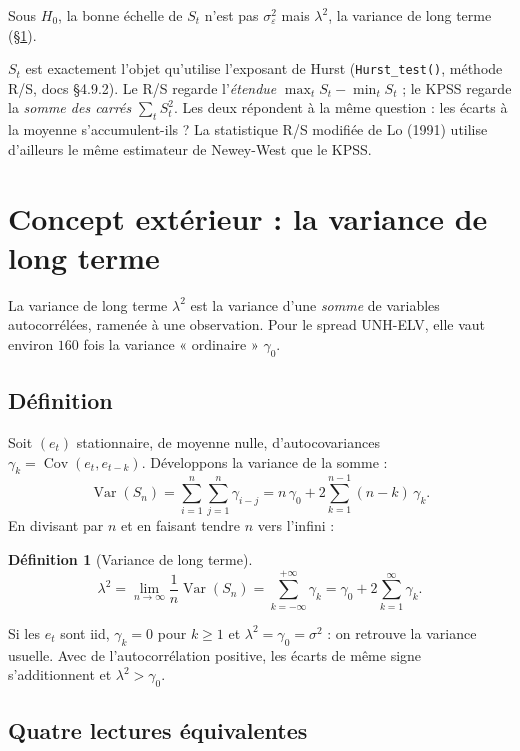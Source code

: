 \documentclass[11pt,a4paper]{article}
\newcommand{\Var}{\operatorname{Var}}
\newcommand{\Cov}{\operatorname{Cov}}
\newcommand{\code}[1]{\texttt{#1}}
\theoremstyle{definition}
\newtheorem{defi}{Définition}
\begin{document}
Sous $H_0$, la bonne échelle de $S_t$ n'est pas $\sigma_\varepsilon^2$ mais $\lambda^2$, la variance de long terme (\S\ref{sec:lrv}).

\begin{projet}
$S_t$ est exactement l'objet qu'utilise l'exposant de Hurst (\code{Hurst\_test()}, méthode R/S, docs \S4.9.2). Le R/S regarde l'\emph{étendue} $\max_t S_t - \min_t S_t$ ; le KPSS regarde la \emph{somme des carrés} $\sum_t S_t^2$. Les deux répondent à la même question : les écarts à la moyenne s'accumulent-ils ? La statistique R/S modifiée de Lo (1991) utilise d'ailleurs le même estimateur de Newey-West que le KPSS.
\end{projet}

\section{Concept extérieur : la variance de long terme}\label{sec:lrv}

La variance de long terme $\lambda^2$ est la variance d'une \emph{somme} de variables autocorrélées, ramenée à une observation. Pour le spread UNH-ELV, elle vaut environ $160$ fois la variance « ordinaire » $\gamma_0$.

\subsection{Définition}

Soit $(e_t)$ stationnaire, de moyenne nulle, d'autocovariances $\gamma_k = \Cov(e_t, e_{t-k})$. Développons la variance de la somme :
\[
\Var(S_n) = \sum_{i=1}^{n}\sum_{j=1}^{n}\gamma_{i-j} = n\,\gamma_0 + 2\sum_{k=1}^{n-1}(n-k)\,\gamma_k .
\]
En divisant par $n$ et en faisant tendre $n$ vers l'infini :

\begin{defi}[Variance de long terme]
\[
\lambda^2 = \lim_{n\to\infty}\frac{1}{n}\Var(S_n) = \sum_{k=-\infty}^{+\infty}\gamma_k = \gamma_0 + 2\sum_{k=1}^{\infty}\gamma_k .
\]
\end{defi}

Si les $e_t$ sont iid, $\gamma_k = 0$ pour $k \ge 1$ et $\lambda^2 = \gamma_0 = \sigma^2$ : on retrouve la variance usuelle. Avec de l'autocorrélation positive, les écarts de même signe s'additionnent et $\lambda^2 > \gamma_0$.

\subsection{Quatre lectures équivalentes}
\end{document}
